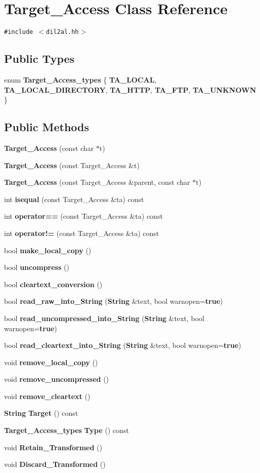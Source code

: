 \section{Target\_\-Access  Class Reference}
\label{classTarget__Access}
{\tt \#include $<$dil2al.hh$>$}

\subsection*{Public Types}
\begin{CompactItemize}
\item 
enum {\bf Target\_\-Access\_\-types} \{ {\bf TA\_\-LOCAL}, 
{\bf TA\_\-LOCAL\_\-DIRECTORY}, 
{\bf TA\_\-HTTP}, 
{\bf TA\_\-FTP}, 
{\bf TA\_\-UNKNOWN}
 \}
\end{CompactItemize}
\subsection*{Public Methods}
\begin{CompactItemize}
\item 
{\bf Target\_\-Access} (const char $\ast$t)
\item 
{\bf Target\_\-Access} (const Target\_\-Access \&t)
\item 
{\bf Target\_\-Access} (const Target\_\-Access \&parent, const char $\ast$t)
\item 
int {\bf isequal} (const Target\_\-Access \&ta) const
\item 
int {\bf operator==} (const Target\_\-Access \&ta) const
\item 
int {\bf operator!=} (const Target\_\-Access \&ta) const
\item 
bool {\bf make\_\-local\_\-copy} ()
\item 
bool {\bf uncompress} ()
\item 
bool {\bf cleartext\_\-conversion} ()
\item 
bool {\bf read\_\-raw\_\-into\_\-String} ({\bf String} \&text, bool warnopen={\bf true})
\item 
bool {\bf read\_\-uncompressed\_\-into\_\-String} ({\bf String} \&text, bool warnopen={\bf true})
\item 
bool {\bf read\_\-cleartext\_\-into\_\-String} ({\bf String} \&text, bool warnopen={\bf true})
\item 
void {\bf remove\_\-local\_\-copy} ()
\item 
void {\bf remove\_\-uncompressed} ()
\item 
void {\bf remove\_\-cleartext} ()
\item 
{\bf String} {\bf Target} () const
\item 
{\bf Target\_\-Access\_\-types} {\bf Type} () const
\item 
void {\bf Retain\_\-Transformed} ()
\item 
void {\bf Discard\_\-Transformed} ()
\end{CompactItemize}
